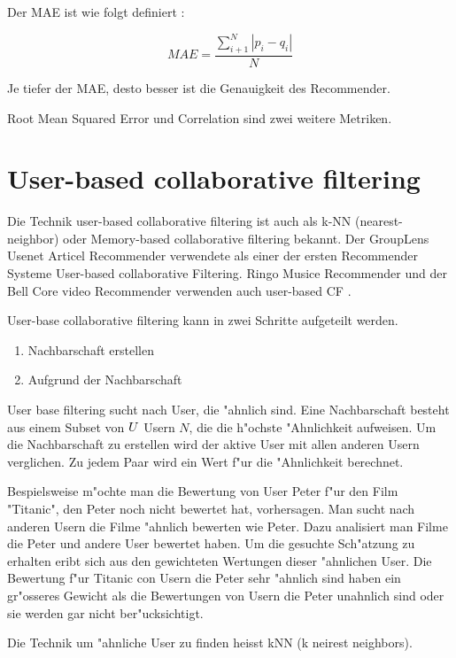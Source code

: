 \documentclass[a4paper, 12pt]{article}
\begin{document}
Der MAE ist wie folgt definiert \cite{sarwar01}:

\begin{equation}
  \label{eq:mae}
  MAE = \frac{\sum_{i+1}^N | p_i-q_i | }{N}
\end{equation}

Je tiefer der MAE, desto besser ist die Genauigkeit des Recommender.

Root Mean Squared Error und Correlation sind zwei weitere Metriken.

\section{User-based collaborative filtering}

Die Technik user-based collaborative filtering ist auch als k-NN (nearest-neighbor) oder Memory-based collaborative filtering bekannt. Der GroupLens Usenet Articel Recommender verwendete als einer der ersten Recommender Systeme User-based collaborative Filtering. Ringo Musice Recommender und der Bell Core video Recommender verwenden auch user-based CF .

User-base collaborative filtering kann in zwei Schritte aufgeteilt werden. 

\begin{enumerate}
\item Nachbarschaft erstellen
\item Aufgrund der Nachbarschaft 
\end{enumerate}

User base filtering sucht nach User, die "ahnlich sind. Eine Nachbarschaft besteht aus einem Subset von $ \mathnormal{U} $ Usern $N$, die die h"ochste "Ahnlichkeit aufweisen. Um die Nachbarschaft zu erstellen wird der aktive User mit allen anderen Usern verglichen. Zu jedem Paar wird ein Wert f"ur die "Ahnlichkeit berechnet.

Bespielsweise m"ochte man die Bewertung von User Peter f"ur den Film "Titanic", den Peter noch nicht bewertet hat, vorhersagen. Man sucht nach anderen Usern die Filme "ahnlich bewerten wie Peter. Dazu analisiert man Filme die Peter und andere User bewertet haben. Um die gesuchte Sch"atzung zu erhalten eribt sich aus den gewichteten Wertungen dieser "ahnlichen User. Die Bewertung f"ur Titanic con Usern die Peter sehr "ahnlich sind haben ein gr"osseres Gewicht als die Bewertungen von Usern die Peter unahnlich sind oder sie werden gar nicht ber"ucksichtigt.

Die Technik um "ahnliche User zu finden heisst kNN (k neirest neighbors). 
\end{document}
